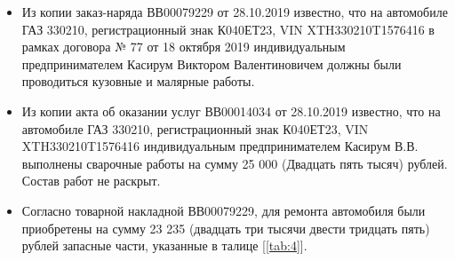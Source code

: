 \begin{itemize}
	\item Из копии заказ-наряда  ВВ00079229 от 28.10.2019 известно, что на автомобиле ГАЗ 330210, регистрационный знак К040ЕТ23, VIN XTH330210T1576416 в рамках договора № 77 от 18 октября 2019 индивидуальным предпринимателем Касирум Виктором Валентиновичем должны были  проводиться кузовные и малярные работы.
	\item Из копии акта об оказании услуг ВВ00014034 от 28.10.2019 известно, что на автомобиле ГАЗ 330210, регистрационный знак К040ЕТ23, VIN XTH330210T1576416 индивидуальным предпринимателем Касирум В.В. выполнены сварочные работы на сумму 25 000 (Двадцать пять тысяч) рублей. Состав работ не раскрыт. 
	\item Согласно товарной накладной ВВ00079229, для ремонта автомобиля были приобретены на сумму 23 235 (двадцать три тысячи двести тридцать пять) рублей	запасные части, указанные в талице [\ref{tab:4}].
\end{itemize}


